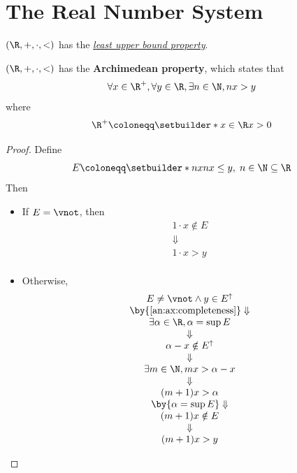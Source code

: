 \section{The Real Number System}

\begin{axiom} \label{an:ax:completeness}
  $(\R, +, \cdot, <)$ has the \hyperref[an:def:least-upper-bound-property]{\emph{least upper bound property}}.
\end{axiom}

\bigskip

\begin{theorem} \label{an:thm:archimedean-property}
  $(\R, +, \cdot, <)$ has the \textbf{Archimedean property}, which states that
  \[
    \forall x \in \R^{+}, \forall y \in \R, \exists n \in \N, nx > y
  \]
  where
  \[
    \R^{+} \coloneqq \setbuilder*{x \in \R}{x > 0}
  \]
\end{theorem}

\begin{proof}
  Define
  \[
    E \coloneqq \setbuilder*{nx}{nx \leq y, \; n \in \N} \subseteq \R
  \]
  Then
  \begin{itemize}
    \item If $E = \vnot$, then
          \[
            \begin{array}{c}
              1 \cdot x \notin E \\
              \Downarrow         \\
              1 \cdot x > y      \\
            \end{array}
          \]
    \item Otherwise,
          \[
            \begin{array}{c}
              E \neq \vnot \land y \in E^{\uparrow}        \\
              \by{\Cref{an:ax:completeness}} \Downarrow    \\
              \exists \alpha \in \R, \alpha = \sup E       \\
              \Downarrow                                   \\
              \alpha - x \notin E^{\uparrow}               \\
              \Downarrow                                   \\
              \exists m \in \N, mx > \alpha - x            \\
              \Downarrow                                   \\
              (m + 1)x > \alpha                            \\
              \by{\ensuremath{\alpha = \sup E}} \Downarrow \\
              (m + 1)x \notin E                            \\
              \Downarrow                                   \\
              (m + 1)x > y
            \end{array}
          \]
  \end{itemize}
\end{proof}

